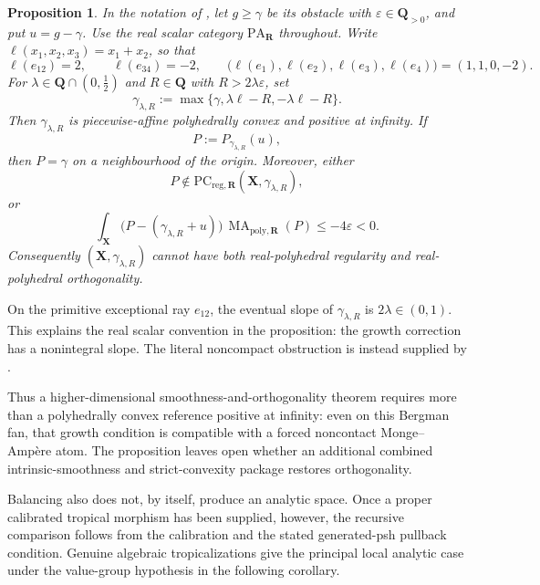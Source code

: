 \documentclass[11pt,a4paper]{article}
\newtheorem{proposition}[proposition]{Proposition}
\theoremstyle{definition}
\theoremstyle{remark}
\DeclareMathOperator{\MA}{MA}
\begin{document}
\begin{proposition}\label{prop:frontier-polyhedral-bergman-positive-infinity-obstruction}
In the notation of \cite[Example~6.24 and Claim~6.25]{BMPS26}, let
\(g\geq\gamma\) be its obstacle with
\(\varepsilon\in\mathbf Q_{>0}\), and put \(u=g-\gamma\).
Use the real scalar category \(\mathrm{PA}_{\mathbf R}\) throughout.
Write
\(\ell(x_1,x_2,x_3)=x_1+x_2\), so that
\[
 \ell(e_{12})=2,
 \qquad
 \ell(e_{34})=-2,
 \qquad
 \bigl(\ell(e_1),\ell(e_2),\ell(e_3),\ell(e_4)\bigr)
   =(1,1,0,-2).
\]
For \(\lambda\in\mathbf Q\cap(0,\tfrac12)\) and
\(R\in\mathbf Q\) with \(R>2\lambda\varepsilon\), set
\[
 \gamma_{\lambda,R}
   :=\max\{\gamma,\lambda\ell-R,-\lambda\ell-R\}.
\]
Then \(\gamma_{\lambda,R}\) is piecewise-affine polyhedrally convex and
positive at infinity.  If
\[
 P:=P_{\gamma_{\lambda,R}}(u),
\]
then \(P=\gamma\) on a neighbourhood of the origin.  Moreover, either
\[
 P\notin
 \mathrm{PC}_{\mathrm{reg},\mathbf R}
     (\mathbf X,\gamma_{\lambda,R}),
\]
or
\[
 \int_{\mathbf X}
 \bigl(P-(\gamma_{\lambda,R}+u)\bigr)\,
 \MA_{\mathrm{poly},\mathbf R}(P)
 \leq -4\varepsilon<0.
\]
Consequently \((\mathbf X,\gamma_{\lambda,R})\) cannot have both
real-polyhedral regularity and real-polyhedral orthogonality.
\end{proposition}



On the primitive exceptional ray \(e_{12}\), the eventual slope of
\(\gamma_{\lambda,R}\) is \(2\lambda\in(0,1)\).  This explains the
real scalar convention in the proposition: the growth correction has a
nonintegral slope.  The literal noncompact obstruction is instead supplied
by .

Thus a higher-dimensional smoothness-and-orthogonality theorem requires
more than a polyhedrally convex reference positive at infinity: even on
this Bergman fan, that growth condition is compatible with a forced
noncontact Monge--Amp\`ere atom.  The proposition leaves open whether an
additional combined intrinsic-smoothness and strict-convexity package restores
orthogonality.

Balancing also does not, by itself, produce an analytic space.  Once a
proper calibrated tropical morphism has been supplied, however, the
recursive comparison follows from the calibration and the stated
generated-psh pullback condition.  Genuine algebraic tropicalizations give
the principal local analytic case under the value-group hypothesis in the
following corollary.
\end{document}
